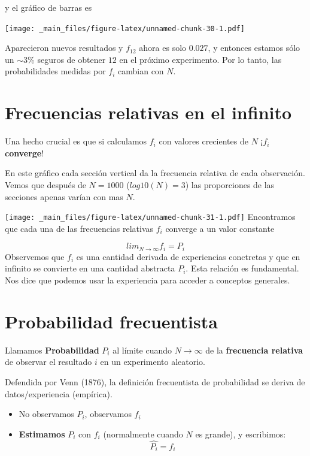 \documentclass[
]{book}
\providecommand{\tightlist}{%
  \setlength{\itemsep}{0pt}\setlength{\parskip}{0pt}}
\begin{document}
y el gráfico de barras es

\texttt{[image: \_main\_files/figure-latex/unnamed-chunk-30-1.pdf]}

Aparecieron nuevos resultados y \(f_{12}\) ahora es solo \(0.027\), y entonces estamos sólo un \(\sim 3\%\) seguros de obtener \(12\) en el próximo experimento. Por lo tanto, las probabilidades medidas por \(f_i\) cambian con \(N\).

\hypertarget{frecuencias-relativas-en-el-infinito}{%
\section{Frecuencias relativas en el infinito}\label{frecuencias-relativas-en-el-infinito}}

Una hecho crucial es que si calculamos \(f_i\) con valores crecientes de \(N\) ¡\(f_i\) \textbf{converge}!

En este gráfico cada sección vertical da la frecuencia relativa de cada observación. Vemos que después de \(N=1000\) (\(log10(N)=3\)) las proporciones de las secciones apenas varían con mas \(N\).

\texttt{[image: \_main\_files/figure-latex/unnamed-chunk-31-1.pdf]}
Encontramos que cada una de las frecuencias relativas \(f_i\) converge a un valor constante

\[lim_{N\rightarrow \infty} f_i = P_i\]
Observemos que \(f_i\) es una cantidad derivada de experiencias conctretas y que en infinito se convierte en una cantidad abstracta \(P_i\). Esta relación es fundamental. Nos dice que podemos usar la experiencia para acceder a conceptos generales.

\hypertarget{probabilidad-frecuentista}{%
\section{Probabilidad frecuentista}\label{probabilidad-frecuentista}}

Llamamos \textbf{Probabilidad} \(P_i\) al límite cuando \(N \rightarrow \infty\) de la \textbf{frecuencia relativa} de observar el resultado \(i\) en un experimento aleatorio.

Defendida por Venn (1876), la definición frecuentista de probabilidad se deriva de datos/experiencia (empírica).

\begin{itemize}
\tightlist
\item
  No observamos \(P_i\), observamos \(f_i\)
\item
  \textbf{Estimamos} \(P_i\) con \(f_i\) (normalmente cuando \(N\) es grande), y escribimos: \[\hat{P_i}=f_i\]
\end{itemize}
\end{document}
